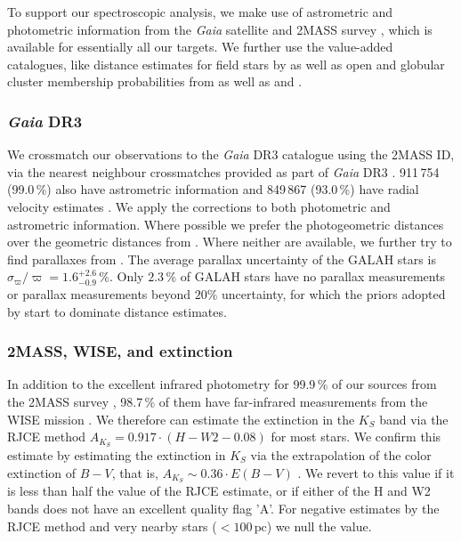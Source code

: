 \documentclass[
  journal=pasa,
  manuscript=research-paper, %
  year=2024,
  volume=37
]{cup-journal}
\newcommand{\Gaia}{\textit{Gaia}\xspace}
\begin{document}
To support our spectroscopic analysis, we make use of astrometric and photometric information from the \Gaia satellite \citep{Gaia-Collaboration2016} and 2MASS survey \citep{Skrutskie2006}, which is available for essentially all our targets. We further use the value-added catalogues, like distance estimates for field stars by \citep{BailerJones2021} as well as open and globular cluster membership probabilities from \citet{CantatGaudin2020} as well as \citet{Vasiliev2021} and \citet{Baumgardt2021}.

\subsubsection{\Gaia DR3}

We crossmatch our observations to the \Gaia DR3 catalogue \citep{Brown2021,GaiaDR3} using the 2MASS ID, via the nearest neighbour crossmatches provided as part of \Gaia DR3 \citep{Torra2021}. 
911\,754 (99.0\,\%) also have astrometric information \citep{Lindegren2021a} and 849\,867 (93.0\,\%) have radial velocity estimates \citep{Katz2023}. We apply the corrections to both photometric \citep{Riello2021} and astrometric \citep{Lindegren2021b}information. Where possible we prefer the photogeometric distances over the geometric distances from \citep{BailerJones2021}. Where neither are available, we further try to find parallaxes from \cite{vanLeeuwen2007}. The average parallax uncertainty of the GALAH stars is $\sigma_{\varpi} / \varpi = 1.6_{-0.9}^{+2.6}\,\mathrm{\%}$. Only $2.3\,\%$ of GALAH stars have no parallax measurements or parallax measurements beyond $20\%$ uncertainty, for which the priors adopted by \citep{BailerJones2021} start to dominate distance estimates.

\subsubsection{2MASS, WISE, and extinction}

In addition to the excellent infrared photometry for 99.9\,\% of our sources from the 2MASS survey \citep{Skrutskie2006}, 98.7\,\% of them have far-infrared measurements from the WISE mission \citep{Cutri2013}. We therefore can estimate the extinction in the $K_S$ band via the RJCE method \citep{Majewski2011} $A_{K_S}  = 0.917 \cdot \left( H - W2 - 0.08 \right)$ for most stars. We confirm this estimate by estimating the extinction in $K_S$ via the extrapolation of the color extinction of $B-V$, that is, $A_{K_S} \sim 0.36 \cdot E(B-V)$ \citep{Cardelli1989}. We revert to this value if it is less than half the value of the RJCE estimate, or if either of the H and W2 bands does not have an excellent quality flag 'A'. For negative estimates by the RJCE method and very nearby stars ($<100\,\mathrm{pc}$) we null the value.
\end{document}
